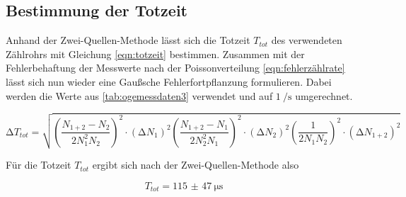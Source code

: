 \subsection{Bestimmung der Totzeit}
Anhand der Zwei-Quellen-Methode lässt sich die Totzeit $T_{tot}$ des verwendeten Zählrohrs mit Gleichung \eqref{eqn:totzeit} bestimmen.
Zusammen mit der Fehlerbehaftung der Messwerte nach der Poissonverteilung \eqref{eqn:fehlerzählrate} lässt sich nun wieder eine
Gaußsche Fehlerfortpflanzung formulieren.
Dabei werden die Werte aus \ref{tab:ogemessdaten3} verwendet und auf $\SI{1}{\per\second}$ umgerechnet.

\begin{equation*}
\increment T_{tot} = \sqrt{\left( \frac{N_{1+2} - N_{2}}{2 N_{1}^{2} N_{2}}\right)^2 \cdot (\increment N_{1})^{2} 
\left( \frac{N_{1+2} - N_{1}}{2 N_{2}^{2} N_{1}}\right)^2 \cdot (\increment N_{2})^{2} 
\left( \frac{1}{2 N_{1} N_{2}}\right)^2 \cdot (\increment N_{1+2})^{2}} 
\end{equation*}

Für die Totzeit $T_{tot}$ ergibt sich nach der Zwei-Quellen-Methode also

\begin{equation}
T_{tot} = \SI{115(47)}{\micro\second}
\end{equation}